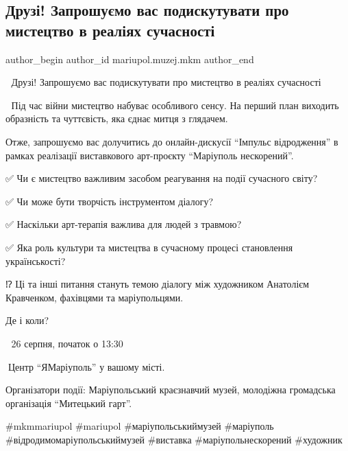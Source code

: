  
 
 
 
 

\subsection{Друзі! Запрошуємо вас подискутувати про мистецтво в реаліях сучасності}
\label{sec:23_08_2023.fb.mariupol.muzej.mkm.1.diskussia_mystectvo_hudozhnyk_anatolij_kravchenko}

\ifcmt
 author_begin
   author_id mariupol.muzej.mkm
 author_end
\fi

📢 Друзі! Запрошуємо вас подискутувати про мистецтво в реаліях сучасності\par
🔶 Під час війни мистецтво набуває особливого сенсу. На перший план виходить образність та чуттєвість, яка єднає митця з глядачем.\par
Отже, запрошуємо вас долучитись до онлайн-дискусії \enquote{Імпульс відродження} в рамках реалізації виставкового арт-проєкту \enquote{Маріуполь нескорений}.\par
✅ Чи є мистецтво важливим засобом реагування на події сучасного світу?\par
✅ Чи може бути творчість інструментом діалогу?\par
✅ Наскільки арт-терапія важлива для людей з травмою?\par
✅ Яка роль культури та мистецтва в сучасному процесі становлення українськості?\par
⁉️ Ці та інші питання стануть темою діалогу між художником Анатолієм Кравченком, фахівцями та маріупольцями.\par
Де і коли?\par
📆 26 серпня, початок о 13:30\par
📍Центр \enquote{ЯМаріуполь} у вашому місті.\par
Організатори події: Маріупольський краєзнавчий музей, молодіжна громадська організація \enquote{Митецький гарт}.\par
\#mkmmariupol \#mariupol \#маріупольськиймузей \#маріуполь \#відродимомаріупольськиймузей \#виставка \#маріупольнескорений \#художник\par

